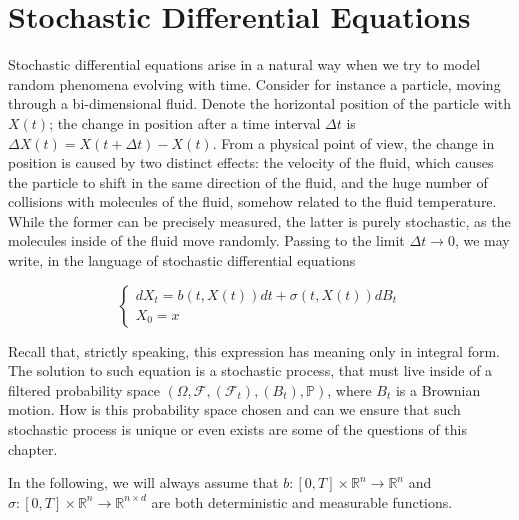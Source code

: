 \section{Stochastic Differential Equations}
Stochastic differential equations arise in a natural way when we try to model random phenomena evolving with time. Consider for instance a particle, moving through a bi-dimensional fluid. Denote the horizontal position of the particle with $X(t)$; the change in position after a time interval $\Delta t$ is $\Delta X(t) = X(t+\Delta t) - X(t)$. From a physical point of view, the change in position is caused by two distinct effects: the velocity of the fluid, which causes the particle to shift in the same direction of the fluid, and the huge number of collisions with molecules of the fluid, somehow related to the fluid temperature. While the former can be precisely measured, the latter is purely stochastic, as the molecules inside of the fluid move randomly. Passing to the limit $\Delta t \to 0$, we may write, in the language of stochastic differential equations

\begin{equation*}
\begin{cases}
    dX_t = b(t,X(t)) dt + \sigma(t,X(t))dB_t \\
    X_0 = x
\end{cases}
\end{equation*}

Recall that, strictly speaking, this expression has meaning only in integral form. The solution to such equation is a stochastic process, that must live inside of a filtered probability space $(\Omega, \mathcal{F}, (\mathcal{F}_t), (B_t),\mathbb{P})$, where $B_t$ is a Brownian motion. How is this probability space chosen and can we ensure that such stochastic process is unique or even exists are some of the questions of this chapter.  

In the following, we will always assume that $b : [0,T] \times \mathbb{R}^n \to \mathbb{R}^n$ and $\sigma : [0,T] \times \mathbb{R}^n \to \mathbb{R}^{n \times d}$ are both deterministic and measurable functions. 

